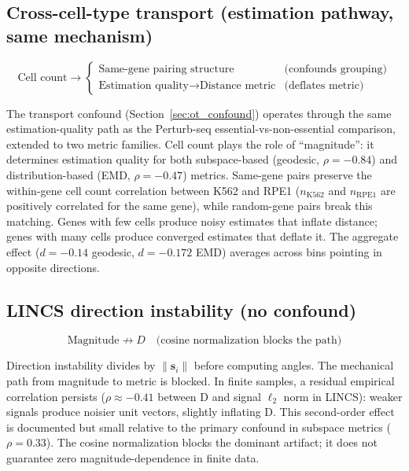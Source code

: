 \documentclass[11pt]{article}
\begin{document}
\subsection{Cross-cell-type transport (estimation pathway, same mechanism)}

\begin{equation*}
\text{Cell count} \rightarrow
\begin{cases}
\text{Same-gene pairing structure} & \text{(confounds grouping)} \\
\text{Estimation quality} \rightarrow \text{Distance metric}
  & \text{(deflates metric)}
\end{cases}
\end{equation*}

The transport confound (Section~\ref{sec:ot_confound}) operates through
the same estimation-quality path as the Perturb-seq essential-vs-non-essential
comparison, extended to two metric families. Cell count plays the role of
``magnitude'': it determines estimation quality for both subspace-based
(geodesic, $\rho = -0.84$) and distribution-based (EMD, $\rho = -0.47$)
metrics. Same-gene pairs preserve the within-gene cell count correlation
between K562 and RPE1 ($n_{\text{K562}}$ and $n_{\text{RPE1}}$ are
positively correlated for the same gene), while random-gene pairs break
this matching. Genes with few cells produce noisy estimates that inflate
distance; genes with many cells produce converged estimates that deflate
it. The aggregate effect ($d = -0.14$ geodesic, $d = -0.172$ EMD)
averages across bins pointing in opposite directions.

\subsection{LINCS direction instability (no confound)}

\begin{equation*}
\text{Magnitude} \not\rightarrow D \quad \text{(cosine normalization
blocks the path)}
\end{equation*}

Direction instability divides by $\|\mathbf{s}_i\|$ before computing
angles. The mechanical path from magnitude to metric is blocked.
In finite samples, a residual empirical correlation persists ($\rho
\approx -0.41$ between D and signal $\ell_2$ norm in LINCS): weaker
signals produce noisier unit vectors, slightly inflating D. This
second-order effect is documented but small relative to the primary
confound in subspace metrics ($\rho = 0.33$). The cosine normalization
blocks the dominant artifact; it does not guarantee zero
magnitude-dependence in finite data.
\end{document}
